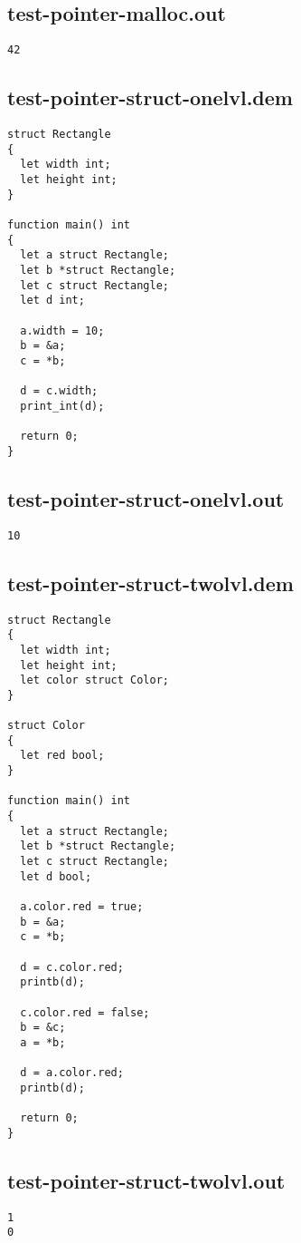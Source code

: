 \subsection{test-pointer-malloc.out}
\begin{lstlisting}
42
\end{lstlisting}
\subsection{test-pointer-struct-onelvl.dem}
\begin{lstlisting}
struct Rectangle
{
  let width int;
  let height int;
}

function main() int
{
  let a struct Rectangle;
  let b *struct Rectangle;
  let c struct Rectangle;
  let d int;

  a.width = 10;
  b = &a;
  c = *b;

  d = c.width;
  print_int(d);

  return 0;
}
\end{lstlisting}
\subsection{test-pointer-struct-onelvl.out}
\begin{lstlisting}
10
\end{lstlisting}
\subsection{test-pointer-struct-twolvl.dem}
\begin{lstlisting}
struct Rectangle
{
  let width int;
  let height int;
  let color struct Color;
}

struct Color
{
  let red bool;
}

function main() int
{
  let a struct Rectangle;
  let b *struct Rectangle;
  let c struct Rectangle;
  let d bool;

  a.color.red = true;
  b = &a;
  c = *b;

  d = c.color.red;
  printb(d);

  c.color.red = false;
  b = &c;
  a = *b;
  
  d = a.color.red;
  printb(d);

  return 0;
}
\end{lstlisting}
\subsection{test-pointer-struct-twolvl.out}
\begin{lstlisting}
1
0
\end{lstlisting}
